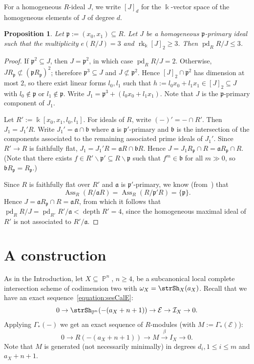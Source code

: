 \documentclass[11pt,a4paper]{amsart}
\theoremstyle{plain}
\newtheorem{proposition}[equation]{Proposition}
\theoremstyle{definition}
\newcommand{\fraka}{{\mathfrak a}}
\newcommand{\frakb}{{\mathfrak b}}
\newcommand{\calE}{\mathcal E}
\newcommand{\calI}{\mathcal I}
\newcommand{\frakp}{{\mathfrak p}}
\DeclareMathOperator{\rank}{rk}
\DeclareMathOperator{\projective}{\mathbb{P}}
\DeclareMathOperator{\projdim}{pd}
\DeclareMathOperator{\depth}{depth}
\newcommand{\minus}{\ensuremath{\smallsetminus}}
\DeclareMathOperator{\Ass}{Ass}
\begin{document}
For a homogeneous $R$-ideal $J$, we write $[J]_d$ for the
$\Bbbk$-vector space of the homogeneous elements of $J$ of degree $d$.

\begin{proposition}
\label{proposition:mult3}
Let $\frakp := (x_0, x_1) \subseteq R$. Let $J$ be a homogeneous
$\frakp$-primary ideal such that the multiplicity $e(R/J) = 3$ 
and $\rank_\Bbbk[J]_2 \geq 3$.
Then $\projdim_R R/J \leq 3$.
\end{proposition}

\begin{proof}
If $\frakp^2 \subseteq J$, then $J = \frakp^2$, in which case $\projdim_R R/J 
= 2$.
Otherwise, $JR_\frakp \not \subset (\frakp R_\frakp)^2$; therefore
$\frakp^3 \subseteq J$ and $J \not \subset \frakp^2$.
Hence $[J]_2 \cap \frakp^2$ has dimension at most $2$, so
there exist linear forms $l_0, l_1$ such that $h := l_0x_0  + l_1x_1
\in [J]_2 \subseteq J$ with $l_0 \not \in \frakp$ or $l_1 \not \in \frakp$.
Write $J_1 = \frakp^3 + (l_0x_0  + l_1x_1)$.
Note that $J$ is the $\frakp$-primary component of $J_1$.

Let $R' := \Bbbk[ x_0, x_1, l_0, l_1]$. 
For ideals of $R$, write $(-)' = - \cap R'$.
Then $J_1 = J_1' R$. Write $J_1' = \fraka \cap \frakb$ 
where $\fraka$ is $\frakp'$-primary and 
$\frakb$ is the intersection of the components associated to the remaining
associated prime ideals of $J_1'$.
Since $R' \to R$ is faithfully flat, 
$J_1 = J_1'R = \fraka R \cap \frakb R$.
Hence $J = J_1R_\frakp \cap R = \fraka R_\frakp \cap R$.
(Note that there exists $f \in R' \minus \frakp' \subseteq R \minus \frakp$ 
such that $f^m \in \frakb$ for all $m \gg 0$, so $\frakb R_\frakp =
R_\frakp$.) 

Since $R$ is faithfully flat over $R'$ and $\fraka$ is $\frakp'$-primary,
we know (from~\cite[(9.B)]{MatsCA80}) that
\[
\Ass_R (R/\fraka R) = \Ass_R (R/\frakp' R) = \{\frakp \}.
\]
Hence $J = \fraka R_\frakp \cap R =\fraka R$, from which it follows that
$\projdim_R R/J = \projdim_{R'} R'/\fraka < \depth R' = 4$, since 
the homogeneous maximal ideal of $R'$ is not associated to 
$R'/\fraka$.
\end{proof}

\section{A construction}
\label{section:construction}

As in the Introduction, let $X \subseteq \projective^n$, $n \geq 4$, 
be a subcanonical
local complete intersection scheme of codimension two with $\omega_X =
\strSh_X(a_X)$.
Recall that we have an exact sequence~\eqref{equation:sesCalE}:
\[
0 \to \strSh_{\projective^n}(-(a_X+n+1)) \to \calE \to \calI_X \to 0.
\]
Applying $\Gamma_*(-)$ we get an exact sequence of $R$-modules (with $M :=
\Gamma_*(\calE)$):
\begin{equation}
\label{equation:MIX}
0 \to R(-(a_X+n+1)) \to M \stackrel{\beta}\to I_X \to 0.
\end{equation}
Note that $M$ is generated (not necessarily minimally) in degrees $d_i, 1
\leq i \leq m$ and $a_X+n+1$.
\end{document}
